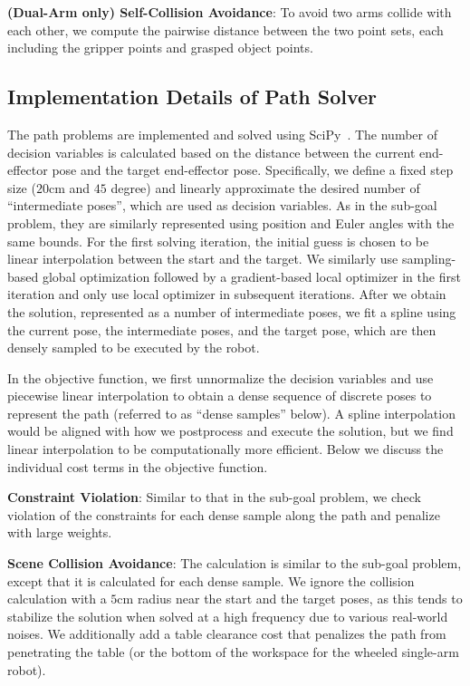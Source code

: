 \textbf{(Dual-Arm only) Self-Collision Avoidance}:
To avoid two arms collide with each other, we compute the pairwise distance between the two point sets, each including the gripper points and grasped object points.

\subsection{Implementation Details of Path Solver}\label{app:path}
The path problems are implemented and solved using SciPy~\cite{virtanen2020scipy}.
The number of decision variables is calculated based on the distance between the current end-effector pose and the target end-effector pose.
Specifically, we define a fixed step size ($20$cm and $45$ degree) and linearly approximate the desired number of ``intermediate poses'', which are used as decision variables.
As in the sub-goal problem, they are similarly represented using position and Euler angles with the same bounds.
For the first solving iteration, the initial guess is chosen to be linear interpolation between the start and the target.
We similarly use sampling-based global optimization followed by a gradient-based local optimizer in the first iteration and only use local optimizer in subsequent iterations.
After we obtain the solution, represented as a number of intermediate poses, we fit a spline using the current pose, the intermediate poses, and the target pose, which are then densely sampled to be executed by the robot.

In the objective function, we first unnormalize the decision variables and use piecewise linear interpolation to obtain a dense sequence of discrete poses to represent the path (referred to as ``dense samples'' below). A spline interpolation would be aligned with how we postprocess and execute the solution, but we find linear interpolation to be computationally more efficient. Below we discuss the individual cost terms in the objective function.

\textbf{Constraint Violation}:
Similar to that in the sub-goal problem, we check violation of the \algabrvname constraints for each dense sample along the path and penalize with large weights.

\textbf{Scene Collision Avoidance}:
The calculation is similar to the sub-goal problem, except that it is calculated for each dense sample. We ignore the collision calculation with a $5$cm radius near the start and the target poses, as this tends to stabilize the solution when solved at a high frequency due to various real-world noises. We additionally add a table clearance cost that penalizes the path from penetrating the table (or the bottom of the workspace for the wheeled single-arm robot).

